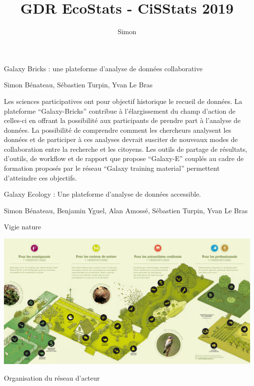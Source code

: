 \documentclass[ignorenonframetext,]{beamer}
\title{GDR EcoStats - CiSStats 2019}
\author{Simon}
\date{}
\begin{document}
\frame{\titlepage}

\begin{frame}{Galaxy Bricks : une plateforme d'analyse de données
collaborative}

Simon Bénateau, Sébastien Turpin, Yvan Le Bras

Les sciences participatives ont pour objectif historique le recueil de
données. La plateforme ``Galaxy-Bricks'' contribue à l'élargissement du
champ d'action de celles-ci en offrant la possibilité aux participants
de prendre part à l'analyse de données. La possibilité de comprendre
comment les chercheurs analysent les données et de participer à ces
analyses devrait susciter de nouveaux modes de collaboration entre la
recherche et les citoyens. Les outils de partage de résultats, d'outils,
de workflow et de rapport que propose ``Galaxy-E'' couplés au cadre de
formation proposés par le réseau ``Galaxy training material'' permettent
d'atteindre ces objectifs.

\end{frame}

\begin{frame}{Galaxy Ecology : Une plateforme d'analyse de données
accessible.}

Simon Bénateau, Benjamin Yguel, Alan Amossé, Sébastien Turpin, Yvan Le
Bras

\end{frame}

\begin{frame}{Vigie nature}

\includegraphics{figures/observatoires_vigienature.jpg}

\end{frame}

\begin{frame}{Organisation du réseau d'acteur}

\begin{center}  
\end{center}

\end{frame}
\end{document}
